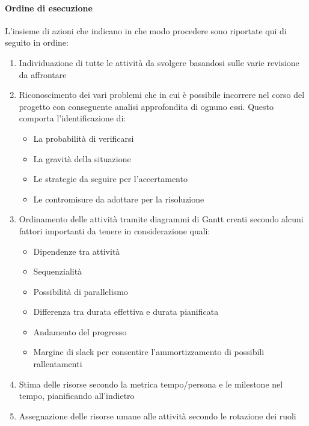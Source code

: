 			\paragraph{Ordine di esecuzione}
			L'insieme di azioni che indicano in che modo procedere sono riportate qui di seguito in ordine:
			\begin{enumerate}
				\item Individuazione di tutte le attività da svolgere basandosi sulle varie revisione da affrontare
				\item Riconoscimento dei vari problemi che in cui è possibile incorrere nel corso del progetto con conseguente analisi approfondita di ognuno essi. Questo comporta l'identificazione di:
				\begin{itemize}
					\item La probabilità di verificarsi 
					\item La gravità della situazione 
					\item Le strategie da seguire per l'accertamento
					\item Le contromisure da adottare per la risoluzione
				\end{itemize}
				\item Ordinamento delle attività tramite diagrammi di Gantt creati secondo alcuni fattori importanti da tenere in considerazione quali:
				\begin{itemize}
					\item Dipendenze tra attività
					\item Sequenzialità
					\item Possibilità di parallelismo
					\item Differenza tra durata effettiva e durata pianificata %
					\item Andamento del progresso
					\item Margine di slack per consentire l'ammortizzamento di possibili rallentamenti
				\end{itemize}
			\item Stima delle risorse secondo la metrica tempo/persona e le milestone nel tempo, pianificando all'indietro %
			\item Assegnazione delle risorse umane alle attività secondo le rotazione dei ruoli %
			\end{enumerate}  

